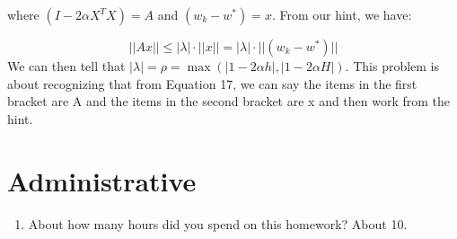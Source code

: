 \documentclass{article}
\begin{document}
\begin{aprob}
\begin{enumerate}
    where $(I-2\alpha X^TX) = A$ and $(w_k-w^*) = x$. From our hint, we have:
    
    \begin{equation}
    ||Ax|| \leq |\lambda|\cdot||x|| = |\lambda|\cdot||(w_k-w^*)||
    \end{equation}
    We can then tell that $|\lambda| = \rho = \max(|1-2\alpha h|, |1-2\alpha H|)$. This problem is about recognizing that from Equation 17, we can say the items in the first bracket are A and the items in the second bracket are x and then work from the hint.

    \end{enumerate}
\end{aprob}

\section*{Administrative}
\begin{aprob}
\begin{enumerate}
    \item {} About how many hours did you spend on this homework? About 10.
\end{enumerate}
\end{aprob}
\end{document}
